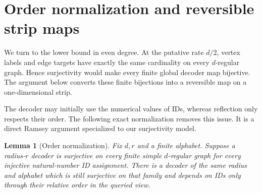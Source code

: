 \documentclass[11pt]{article}
\newtheorem{lemma}[theorem]{Lemma}
\theoremstyle{definition}
\theoremstyle{remark}
\begin{document}
\section{Order normalization and reversible strip maps}
\label{sec:normalization}

We turn to the lower bound in even degree.  At the putative rate $d/2$,
vertex labels and edge targets have exactly the same cardinality on every
$d$-regular graph.  Hence surjectivity would make every finite global decoder
map bijective.  The argument below converts these finite bijections into a
reversible map on a one-dimensional strip.

The decoder may initially use the numerical values of IDs, whereas reflection
only respects their order.  The following exact normalization removes this
issue.  It is a direct Ramsey argument specialized to our surjectivity model.

\begin{lemma}[Order normalization]
\label{lem:order-normalization}
Fix $d,r$ and a finite alphabet.  Suppose a radius-$r$ decoder is surjective
on every finite simple $d$-regular graph for every injective natural-number
ID assignment.  There is a decoder of the same radius and alphabet which is
still surjective on that family and depends on IDs only through their relative
order in the queried view.
\end{lemma}
\end{document}
